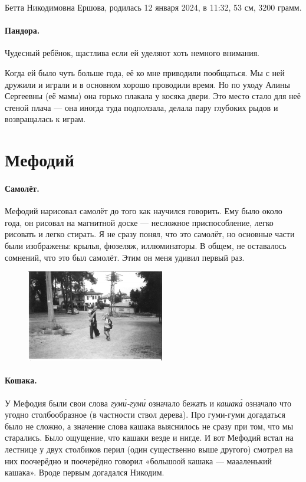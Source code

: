 \documentclass{book}
\begin{document}
Бетта Никодимовна Ершова, родилась 12 января 2024, в 11:32, 53 см, 3200 грамм.

\paragraph{Пандора.}
Чудесный ребёнок, щастлива если ей уделяют хоть немного внимания.

Когда ей было чуть больше года, её ко мне приводили пообщаться.
Мы с ней дружили и играли и в основном хорошо проводили время.
Но по уходу Алины Сергеевны (её мамы) она горько плакала у косяка двери.
Это место стало для неё стеной плача --- она иногда туда подползала, делала пару глубоких рыдов и возвращалась к играм.


\section*{Мефодий}

\paragraph{Самолёт.} Мефодий нарисовал самолёт до того как научился говорить.
Ему было около года, он рисовал на магнитной доске --- несложное приспособление, легко рисовать и легко стирать.
Я не сразу понял, что это самолёт, но основные части были изображены: крылья, фюзеляж, иллюминаторы.
В общем, не оставалось сомнений, что это был самолёт.
Этим он меня удивил первый раз.

\begin{figure}
\vskip-7mm
\centering
\includegraphics[width=60mm,angle=0]{photo/tosha-nikodim-mefody-bw}
\end{figure}

\paragraph{Кошака.} У Мефодия были свои слова \textit{гум\'{и}-гум\'{и}} означало бежать и \textit{кашак\'{а}} означало что угодно столбообразное (в частности ствол дерева).
Про гуми-гуми догадаться было не сложно, а значение слова кашака выяснилось не сразу при том, что мы старались.
Было ощущение, что кашаки везде и нигде.
И вот Мефодий встал на лестнице у двух столбиков перил (один существенно выше другого) смотрел на них поочерёдно и поочерёдно говорил «большоой кашака --- маааленький кашака».
Вроде первым догадался Никодим.
\end{document}

